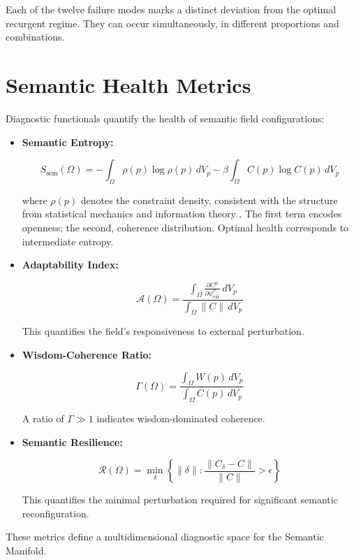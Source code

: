 Each of the twelve failure modes marks a distinct deviation from the optimal recurgent regime. They can occur simultaneously, in different proportions and combinations.


\section{Semantic Health Metrics}
\label{16.4:semantic_health_metrics}

Diagnostic functionals quantify the health of semantic field configurations:

\begin{itemize}

    \item \textbf{Semantic Entropy:}

    \begin{equation}
    S_{\text{sem}}(\Omega) = -\int_{\Omega} \rho(p) \log\rho(p) \, dV_p - \beta \int_{\Omega} C(p) \log C(p) \, dV_p
    \end{equation}

where $\rho(p)$ denotes the constraint density, consistent with the structure from statistical mechanics and information theory \autocite{Shannon1948, CoverThomas2006, Reif1965, PathriaBeale2011}. The first term encodes openness; the second, coherence distribution. Optimal health corresponds to intermediate entropy.

    \item \textbf{Adaptability Index:}

    \begin{equation}
    \mathcal{A}(\Omega) = \frac{\int_{\Omega} \frac{\partial C^\mu}{\partial \psi^\nu_{\text{ext}}} \, dV_p}{\int_{\Omega} \|C\| \, dV_p}
    \end{equation}

    This quantifies the field's responsiveness to external perturbation.

    \item \textbf{Wisdom-Coherence Ratio:}

    \begin{equation}
    \Gamma(\Omega) = \frac{\int_{\Omega} W(p) \, dV_p}{\int_{\Omega} C(p) \, dV_p}
    \end{equation}

    A ratio of $\Gamma \gg 1$ indicates wisdom-dominated coherence.

    \item \textbf{Semantic Resilience:}

    \begin{equation}
    \mathcal{R}(\Omega) = \min_{\delta} \left\{\|\delta\| : \frac{\|C_{\delta} - C\|}{\|C\|} > \epsilon\right\}
    \end{equation}

    This quantifies the minimal perturbation required for significant semantic reconfiguration.

\end{itemize}

These metrics define a multidimensional diagnostic space for the Semantic Manifold. 
